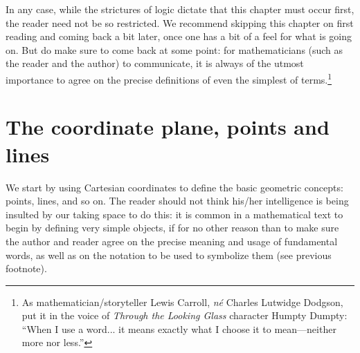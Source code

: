 \documentclass[12pt]{book}
\numberwithin{exc}{section}
\numberwithin{figure}{section}
\numberwithin{equation}{theorem}
\begin{document}
In any case, while the strictures
of logic dictate that this chapter must occur first, the reader need not
be so restricted. We recommend skipping this chapter on first reading
and coming back a bit later, once one has a bit of a feel for what
is going on. But do make sure to come back at some point: for mathematicians (such as the reader and the author)
to communicate, it is always of the utmost importance to agree on the
precise definitions of even the simplest of terms.\footnote{As mathematician/storyteller Lewis Carroll,  \textit{n\'e} Charles Lutwidge Dodgson,  put it in the voice of \emph{Through the Looking Glass} character Humpty Dumpty: ``When I use a word... it means exactly what I choose it to
mean---neither more nor less.''}

\section{The coordinate plane, points and lines}

We start by using Cartesian coordinates to define the basic geometric
concepts: points, lines, and so on.
The reader should not think his/her intelligence is being insulted by
our taking space to do this: it is common in a mathematical text to begin
by defining very simple objects, if for no other reason than to make sure
the author and reader agree on the precise meaning and usage of fundamental
words, as well as on the notation to be used to symbolize them (see previous footnote).
\end{document}
